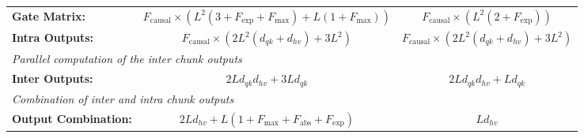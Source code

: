 \documentclass{article}
\begin{document}
\begin{table}[htbp]
\begin{adjustbox}{width=\textwidth}
\begin{tabular}{lcc}
                \textbf{Gate Matrix:}             & $F_\text{causal} \times \left( L^2(3 + F_\text{exp} + F_\text{max}) + L(1+F_\text{max}) \right)$ & $F_\text{causal} \times \left( L^2(2 + F_\text{exp}) \right)$       \\
                \textbf{Intra Outputs:}           & $F_\text{causal} \times \left( 2L^2(d_{qk} + d_{hv}) + 3L^2\right)$                              & $F_\text{causal} \times \left( 2L^2(d_{qk} + d_{hv}) + 3L^2\right)$ \\
                \midrule
                \multicolumn{3}{l}{\textit{Parallel computation of the inter chunk outputs}}                                                                                                                               \\
                \textbf{Inter Outputs:}           & $2L d_{qk} d_{hv} + 3 L d_{qk}$                                                                  & $2L d_{qk} d_{hv} + L d_{qk}$                                       \\
                \midrule
                \multicolumn{3}{l}{\textit{Combination of inter and intra chunk outputs}}                                                                                                                                  \\
                \textbf{Output Combination:}      & $2 L d_{hv} + L (1 + F_\text{max} + F_\text{abs} + F_\text{exp})$                                & $L d_{hv}$                                                          \\
                \bottomrule
            \end{tabular}
        \end{adjustbox}
        \vspace{-0.2cm}
    \end{table}
\end{document}
